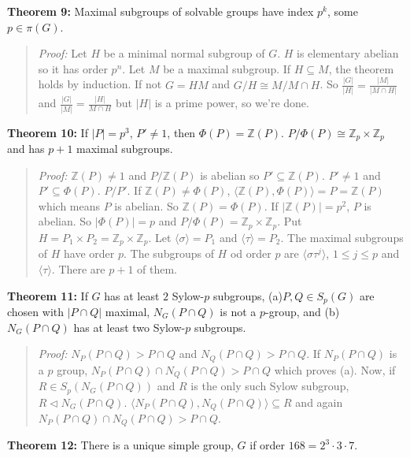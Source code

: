 {\bf Theorem 9:} Maximal subgroups of solvable groups have index $p^k$, some $p \in \pi(G)$.
\begin{quote}
\emph{Proof:}
Let $H$ be a minimal normal subgroup of $G$. $H$ is elementary abelian so it has order $p^n$.
Let $M$ be a maximal subgroup.  If $H \subseteq M$, the theorem holds by induction.  If not
$G=HM$ and $G/H \cong M/M \cap H$.  So ${\frac {|G|} {|H|}} = {\frac {|M|}{|M \cap H|}}$ and
${\frac {|G|} {|M|}} = {\frac {|H|} {M \cap H}}$ but $|H|$ is a prime power, so we're done.
\end{quote}
{\bf Theorem 10:} If $|P|= p^3$, $P' \ne 1$, then $\Phi(P) = {\mathbb Z}(P)$.
$P/\Phi(P) \cong {\mathbb Z}_p \times {\mathbb Z}_p$ and
has $p+1$ maximal subgroups.
\begin{quote}
\emph{Proof:}
${\mathbb Z}(P) \ne 1$ and $P/{\mathbb Z}(P)$ is abelian so $P' \subseteq {\mathbb Z}(P)$.
$P' \ne 1$ and $P' \subseteq \Phi(P)$. $P/P'$.  If ${\mathbb Z}(P) \ne \Phi(P)$,
$\langle {\mathbb Z}(P),  \Phi(P) \rangle = P=  {\mathbb Z}(P)$ which means $P$ is abelian.
So ${\mathbb Z}(P) = \Phi(P)$.  If $|{\mathbb Z}(P)| = p^2$, $P$ is abelian. So $|\Phi(P)|=p$
and $P/\Phi(P) = {\mathbb Z}_p \times {\mathbb Z}_p $.
Put $H = P_1 \times P_2 = {\mathbb Z}_p \times {\mathbb Z}_p$.
Let $\langle \sigma \rangle = P_1$ and
$\langle \tau \rangle = P_2$.  The maximal subgroups of $H$ have order $p$.  The
subgroups of $H$ od order $p$ are $\langle \sigma \tau^j \rangle$, $1 \leq j \leq p$ and
$\langle \tau \rangle$.  There are $p+1$ of them.
\end{quote}
{\bf Theorem 11:} If $G$ has at least $2$ Sylow-$p$ subgroups, (a)$P,Q \in S_p(G)$ are chosen
with $|P \cap Q|$ maximal, $N_G(P \cap Q)$
is not a $p$-group, and (b) $N_G(P \cap Q)$ has at least two Sylow-$p$ subgroups.
\begin{quote}
\emph{Proof:}
$N_P(P \cap Q) > P \cap Q$ and $N_Q(P \cap Q) > P \cap Q$.  If $N_P(P \cap Q)$ is a $p$ group,
$N_P(P \cap Q) \cap N_Q(P \cap Q) > P \cap Q$ which proves (a).  Now, if $R \in S_p(N_G(P \cap Q))$
and $R$ is the only such Sylow subgroup, $R \lhd N_G(P \cap Q)$.
$\langle N_P(P \cap Q), N_Q(P \cap Q) \rangle \subseteq R$ and again
$N_P(P \cap Q) \cap N_Q(P \cap Q) > P \cap Q$.
\end{quote}
{\bf Theorem 12:} There is a unique simple group, $G$ if order $168= 2^3 \cdot 3 \cdot 7$.
